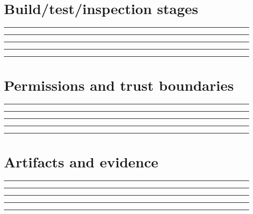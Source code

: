 \documentclass[11pt,letterpaper]{article}
\begin{document}
\section{Build/test/inspection stages}
\vspace{2mm}
\noindent\rule{0.93\linewidth}{0.4pt}\par\vspace{13pt}
\noindent\rule{0.93\linewidth}{0.4pt}\par\vspace{13pt}
\noindent\rule{0.93\linewidth}{0.4pt}\par\vspace{13pt}
\noindent\rule{0.93\linewidth}{0.4pt}\par\vspace{13pt}
\noindent\rule{0.93\linewidth}{0.4pt}\par\vspace{13pt}
\section{Permissions and trust boundaries}
\vspace{2mm}
\noindent\rule{0.93\linewidth}{0.4pt}\par\vspace{13pt}
\noindent\rule{0.93\linewidth}{0.4pt}\par\vspace{13pt}
\noindent\rule{0.93\linewidth}{0.4pt}\par\vspace{13pt}
\noindent\rule{0.93\linewidth}{0.4pt}\par\vspace{13pt}
\noindent\rule{0.93\linewidth}{0.4pt}\par\vspace{13pt}
\section{Artifacts and evidence}
\vspace{2mm}
\noindent\rule{0.93\linewidth}{0.4pt}\par\vspace{13pt}
\noindent\rule{0.93\linewidth}{0.4pt}\par\vspace{13pt}
\noindent\rule{0.93\linewidth}{0.4pt}\par\vspace{13pt}
\noindent\rule{0.93\linewidth}{0.4pt}\par\vspace{13pt}
\noindent\rule{0.93\linewidth}{0.4pt}\par\vspace{13pt}
\end{document}
